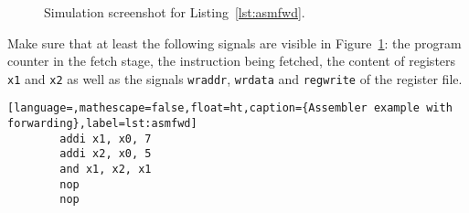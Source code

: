 \begin{figure}[ht!]
	\dummyimage
	\caption{Simulation screenshot for Listing~\ref{lst:asmfwd}.}
	\label{fig:sim1}
\end{figure}

Make sure that at least the following signals are visible in
Figure~\ref{fig:sim1}: the program counter in the fetch stage, the
instruction being fetched, the content of registers \texttt{x1} 
and \texttt{x2} as well as the signals \texttt{wraddr},
\texttt{wrdata} and \texttt{regwrite} of the register file.

\begin{lstlisting}[language=,mathescape=false,float=ht,caption={Assembler example with forwarding},label=lst:asmfwd]
        addi x1, x0, 7
        addi x2, x0, 5
        and x1, x2, x1
        nop
        nop
\end{lstlisting}

